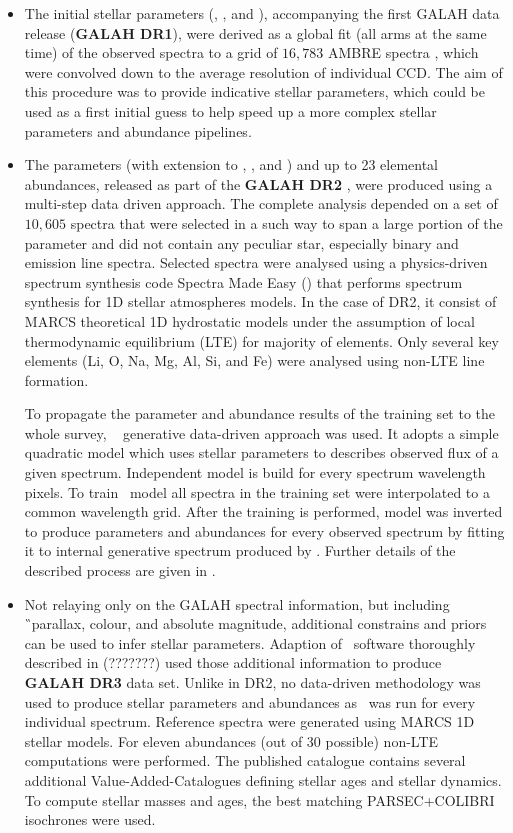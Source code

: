 \begin{itemize}
	\item The initial stellar parameters (\Teff, \Logg, and \Feh), accompanying the first GALAH data release (\textbf{GALAH DR1}), were derived as a global fit (all arms at the same time) of the observed spectra to a grid of $16,783$ AMBRE spectra \citep{2012A&A...544A.126D}, which were convolved down to the average resolution of individual CCD. The aim of this procedure was to provide indicative stellar parameters, which could be used as a first initial guess to help speed up a more complex stellar parameters and abundance pipelines.
	
	\item The parameters (with extension to \vsin, \vmic, and \aks) and up to 23 elemental abundances, released as part of the \textbf{GALAH DR2} \citep{buder2018}, were produced using a multi-step data driven approach. The complete analysis depended on a set of $10,605$ spectra that were selected in a such way to span a large portion of the parameter and did not contain any peculiar star, especially binary and emission line spectra. Selected spectra were analysed using a physics-driven spectrum synthesis code Spectra Made Easy (\SM) \citep{1996A&AS..118..595V, 2017A&A...597A..16P} that performs spectrum synthesis for 1D stellar atmospheres models. In the case of DR2, it consist of MARCS theoretical 1D hydrostatic models \citep{2008A&A...486..951G} under the assumption of local thermodynamic equilibrium (LTE) for majority of elements. Only several key elements (Li, O, Na, Mg, Al, Si, and Fe) were analysed using non-LTE line formation.
	
	To propagate the parameter and abundance results of the training set to the whole survey, \TC\ \citep{2015ApJ...808...16N} generative data-driven approach was used. It adopts a simple quadratic model which uses stellar parameters to describes observed flux of a given spectrum. Independent model is build for every spectrum wavelength pixels. To train \TC\ model all spectra in the training set were interpolated to a common wavelength grid. After the training is performed, model was inverted to produce parameters and abundances for every observed spectrum by fitting it to internal generative spectrum produced by \TC. Further details of the described process are given in \citet{buder2018}.
	
	\item Not relaying only on the GALAH spectral information, but including \G\ parallax, colour, and absolute magnitude, additional constrains and priors can be used to infer stellar parameters. Adaption of \SM\ software thoroughly described in (???????) used those additional information to produce \textbf{GALAH DR3} data set. Unlike in DR2, no data-driven methodology was used to produce stellar parameters and abundances as \SM\ was run for every individual spectrum. Reference spectra were generated using MARCS 1D stellar models. For eleven abundances (out of 30 possible) non-LTE computations were performed. The published catalogue contains several additional Value-Added-Catalogues defining stellar ages and stellar dynamics. To compute stellar masses and ages, the best matching PARSEC+COLIBRI isochrones were used.
	

\end{itemize}
